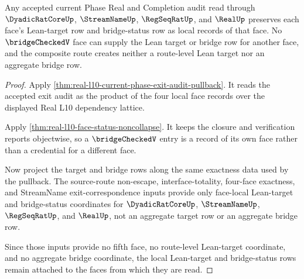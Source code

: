\begin{theorem}
\label{thm:real-l10-face-leantarget-noncollapse}
Any accepted current Phase Real and Completion audit read through
$\DyadicRatCoreUp$, $\StreamNameUp$, $\RegSeqRatUp$, and $\RealUp$ preserves
each face's Lean-target row and bridge-status row as local records of that
face. No $\bridgeCheckedV$ face can supply the Lean target or bridge row for
another face, and the composite route creates neither a route-level Lean
target nor an aggregate bridge row.
\end{theorem}
\begin{proof}
Apply \autoref{thm:real-l10-current-phase-exit-audit-pullback}. It reads the
accepted exit audit as the product of the four local face records over the
displayed Real L10 dependency lattice.

Apply \autoref{thm:real-l10-face-status-noncollapse}. It keeps the closure
and verification reports objectwise, so a $\bridgeCheckedV$ entry is a record
of its own face rather than a credential for a different face.

Now project the target and bridge rows along the same exactness data used by
the pullback. The source-route non-escape, interface-totality, four-face
exactness, and StreamName exit-correspondence inputs provide only face-local
Lean-target and bridge-status coordinates for $\DyadicRatCoreUp$,
$\StreamNameUp$, $\RegSeqRatUp$, and $\RealUp$, not an aggregate target row or
an aggregate bridge row.

Since those inputs provide no fifth face, no route-level Lean-target
coordinate, and no aggregate bridge coordinate, the local Lean-target and
bridge-status rows remain attached to the faces from which they are read.
\end{proof}

